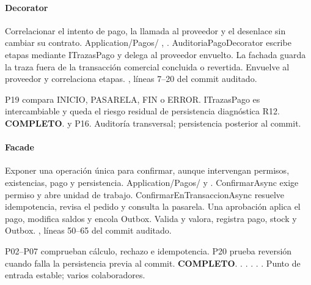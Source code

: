 \paragraph{Decorator}
 Correlacionar el intento de pago, la llamada al proveedor y el desenlace sin cambiar su contrato.
 Application/Pagos/ , . AuditoriaPagoDecorator escribe etapas mediante ITrazasPago y delega al proveedor envuelto. La fachada guarda la traza fuera de la transacción comercial concluida o revertida.
 Envuelve al proveedor y correlaciona etapas.
 , líneas 7--20 del commit auditado.

 P19 compara INICIO, PASARELA, FIN o ERROR. ITrazasPago es intercambiable y queda el riesgo residual de persistencia diagnóstica R12. \textbf{COMPLETO}.
  y P16.
 Auditoría transversal; persistencia posterior al commit.
\medskip
\clearpage
\paragraph{Facade}
 Exponer una operación única para confirmar, aunque intervengan permisos, existencias, pago y persistencia.
 Application/Pagos/  y . ConfirmarAsync exige permiso y abre unidad de trabajo. ConfirmarEnTransaccionAsync resuelve idempotencia, revisa el pedido y consulta la pasarela. Una aprobación aplica el pago, modifica saldos y encola Outbox.
 Valida y valora, registra pago, stock y Outbox.
 , líneas 50--65 del commit auditado.

 P02–P07 comprueban cálculo, rechazo e idempotencia. P20 prueba reversión cuando falla la persistencia previa al commit. \textbf{COMPLETO}.
 . . . . .
 Punto de entrada estable; varios colaboradores.
\medskip
\clearpage
